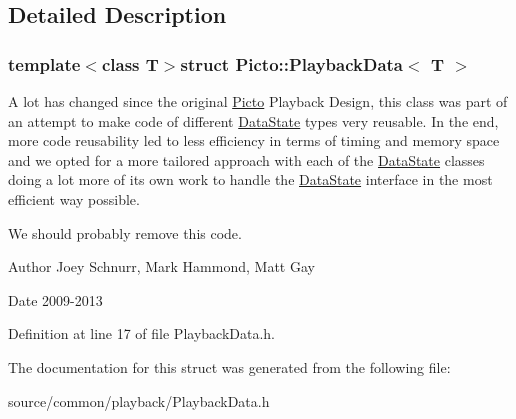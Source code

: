 \subsection{Detailed Description}
\subsubsection*{template$<$class T$>$struct Picto\-::\-Playback\-Data$<$ T $>$}

A lot has changed since the original \hyperlink{namespace_picto}{Picto} Playback Design, this class was part of an attempt to make code of different \hyperlink{class_picto_1_1_data_state}{Data\-State} types very reusable. In the end, more code reusability led to less efficiency in terms of timing and memory space and we opted for a more tailored approach with each of the \hyperlink{class_picto_1_1_data_state}{Data\-State} classes doing a lot more of its own work to handle the \hyperlink{class_picto_1_1_data_state}{Data\-State} interface in the most efficient way possible. 

We should probably remove this code. \begin{DoxyAuthor}{Author}
Joey Schnurr, Mark Hammond, Matt Gay 
\end{DoxyAuthor}
\begin{DoxyDate}{Date}
2009-\/2013 
\end{DoxyDate}


Definition at line 17 of file Playback\-Data.\-h.



The documentation for this struct was generated from the following file\-:\begin{DoxyCompactItemize}
\item 
source/common/playback/Playback\-Data.\-h\end{DoxyCompactItemize}
